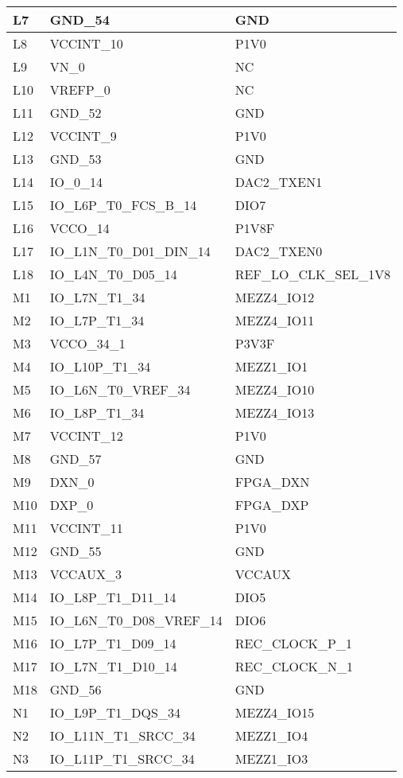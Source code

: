 \begin{footnotesize}
\begin{longtable}{|l|p{6cm}|p{6cm}|}
L7	&	GND\_54	&	GND	\\ \hline
L8	&	VCCINT\_10	&	P1V0	\\ \hline
L9	&	VN\_0	&	NC	\\ \hline
L10	&	VREFP\_0	&	NC	\\ \hline
L11	&	GND\_52	&	GND	\\ \hline
L12	&	VCCINT\_9	&	P1V0	\\ \hline
L13	&	GND\_53	&	GND	\\ \hline
L14	&	IO\_0\_14	&	DAC2\_TXEN1	\\ \hline
L15	&	IO\_L6P\_T0\_FCS\_B\_14	&	DIO7	\\ \hline
L16	&	VCCO\_14	&	P1V8F	\\ \hline
L17	&	IO\_L1N\_T0\_D01\_DIN\_14	&	DAC2\_TXEN0	\\ \hline
L18	&	IO\_L4N\_T0\_D05\_14	&	REF\_LO\_CLK\_SEL\_1V8	\\ \hline
M1	&	IO\_L7N\_T1\_34	&	MEZZ4\_IO12	\\ \hline
M2	&	IO\_L7P\_T1\_34	&	MEZZ4\_IO11	\\ \hline
M3	&	VCCO\_34\_1	&	P3V3F	\\ \hline
M4	&	IO\_L10P\_T1\_34	&	MEZZ1\_IO1	\\ \hline
M5	&	IO\_L6N\_T0\_VREF\_34	&	MEZZ4\_IO10	\\ \hline
M6	&	IO\_L8P\_T1\_34	&	MEZZ4\_IO13	\\ \hline
M7	&	VCCINT\_12	&	P1V0	\\ \hline
M8	&	GND\_57	&	GND	\\ \hline
M9	&	DXN\_0	&	FPGA\_DXN	\\ \hline
M10	&	DXP\_0	&	FPGA\_DXP	\\ \hline
M11	&	VCCINT\_11	&	P1V0	\\ \hline
M12	&	GND\_55	&	GND	\\ \hline
M13	&	VCCAUX\_3	&	VCCAUX	\\ \hline
M14	&	IO\_L8P\_T1\_D11\_14	&	DIO5	\\ \hline
M15	&	IO\_L6N\_T0\_D08\_VREF\_14	&	DIO6	\\ \hline
M16	&	IO\_L7P\_T1\_D09\_14	&	REC\_CLOCK\_P\_1	\\ \hline
M17	&	IO\_L7N\_T1\_D10\_14	&	REC\_CLOCK\_N\_1	\\ \hline
M18	&	GND\_56	&	GND	\\ \hline
N1	&	IO\_L9P\_T1\_DQS\_34	&	MEZZ4\_IO15	\\ \hline
N2	&	IO\_L11N\_T1\_SRCC\_34	&	MEZZ1\_IO4	\\ \hline
N3	&	IO\_L11P\_T1\_SRCC\_34	&	MEZZ1\_IO3	\\ \hline

\end{longtable}
\end{footnotesize}
